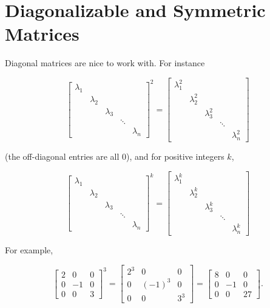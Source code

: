 \documentclass[
]{book}
\theoremstyle{definition}
\theoremstyle{definition}
\theoremstyle{definition}
\theoremstyle{definition}
\theoremstyle{remark}
\begin{document}
\section{Diagonalizable and Symmetric Matrices}\label{DSM}

Diagonal matrices are nice to work with. For instance

\[\begin{bmatrix}\lambda_1 &  &  &  & \\ & \lambda_2 &&&\\ & & \lambda_3 & &\\ &&&\ddots &\\&&&& \lambda_n\end{bmatrix}^2=\begin{bmatrix}\lambda_1^2 &  &  &  & \\ & \lambda_2^2 &&&\\ & & \lambda_3^2 & &\\ &&&\ddots &\\&&&& \lambda_n^2\end{bmatrix}\]

(the off-diagonal entries are all 0), and for positive integers \(k\),

\[\begin{bmatrix}\lambda_1 &  &  &  & \\ & \lambda_2 &&&\\ & & \lambda_3 & &\\ &&&\ddots &\\&&&& \lambda_n\end{bmatrix}^k=\begin{bmatrix}\lambda_1^k &  &  &  & \\ & \lambda_2^k &&&\\ & & \lambda_3^k & &\\ &&&\ddots &\\&&&& \lambda_n^k\end{bmatrix}\]

For example,

\[\begin{bmatrix}2 & 0 & 0\\0 & -1 & 0\\0 & 0 & 3\end{bmatrix}^3=\begin{bmatrix}2^3 & 0 & 0\\0 & (-1)^3 & 0\\0 & 0 & 3^3\end{bmatrix}=\begin{bmatrix}8 & 0 & 0\\0 & -1 & 0\\0 & 0 & 27\end{bmatrix}.\]
\end{document}
